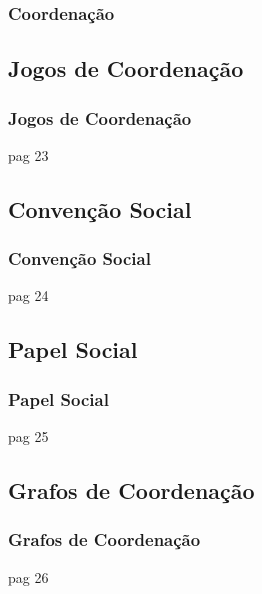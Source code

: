 \begin{frame}
\frametitle{Coordenação}



\end{frame}




\subsection{Jogos de Coordenação}

\begin{frame}
\frametitle{Jogos de Coordenação}

pag 23


\end{frame}


\subsection{Convenção Social}

\begin{frame}
\frametitle{Convenção Social}

pag 24


\end{frame}

\subsection{Papel Social}

\begin{frame}
\frametitle{Papel Social}

pag 25


\end{frame}



\subsection{Grafos de Coordenação}

\begin{frame}
\frametitle{Grafos de Coordenação}

pag 26


\end{frame}


